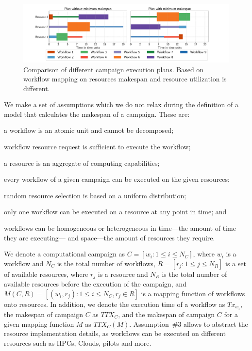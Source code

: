 \begin{figure}[ht!]
    \centering
    \includegraphics[width=.99\textwidth]{figures/campaign/plan_comp.pdf}
    \caption{Comparison of different campaign execution plans. Based on workflow mapping on resources makespan and resource utilization is different.}\label{fig:example_makespan}
\end{figure}

We make a set of assumptions which we do not relax during the definition of a model that calculates the makespan of a campaign.
These are:
\begin{inparaenum}[(1)]
    \item a workflow is an atomic unit and cannot be decomposed;
    \item workflow resource request is sufficient to execute the workflow;
    \item a resource is an aggregate of computing capabilities;
    \item every workflow of a given campaign can be executed on the given resources;
    \item random resource selection is based on a uniform distribution;
    \item only one workflow can be executed on a resource at any point in time; and
    \item workflows can be homogeneous or heterogeneous in time---the amount of time they are executing--- and space---the amount of resources they require.
\end{inparaenum}

We denote a computational campaign as $C = [w_{i}: 1 \leq i \leq N_{C}]$, where $w_{i}$ is a workflow and $N_{C}$ is the total number of workflows, $R = [ r_{j}: 1 \leq j \leq N_{R}]$ is a set of available resources, where $r_{j}$ is a resource and $N_{R}$ is the total number of available resources before the execution of the campaign, and $ M(C,R) = [(w_i, r_j): 1 \leq i \leq N_{C}, r_j \in R] $ is a mapping function of workflows onto resources.
In addition, we denote the execution time of a workflow as $Tx_{w_{i}}$, the makespan of campaign $C$ as $TTX_{C}$, and the makespan of campaign $C$ for a given mapping function $ M $ as $TTX_{C}(M)$.
Assumption~\#3 allows to abstract the resource implementation details, as workflows can be executed on different resources such as HPCs, Clouds, pilots and more. 

